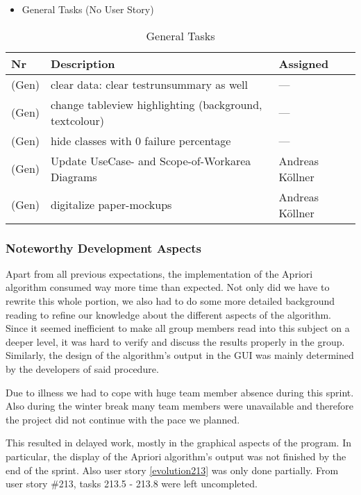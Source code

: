 \begin{itemize}
	\item General Tasks (No User Story)
	\end{itemize}

\begin{table}[h]
  \caption{General Tasks}
  \label{General Tasks}
  \centering
  \begin{tabular}{p{1cm}|p{5cm}|p{3cm}|}
  	Nr & Description & Assigned \\ 
  	\hline
  	(Gen) & clear data: clear testrunsummary as well & --- \\ 
  	\hline
  	(Gen) & change tableview highlighting (background, textcolour) & --- \\ 
  	\hline
  	(Gen) & hide classes with 0 failure percentage & --- \\ 
  	\hline
  	(Gen) & Update UseCase- and Scope-of-Workarea Diagrams & Andreas Köllner \\ 
  	\hline
  	(Gen) & digitalize paper-mockups & Andreas Köllner \\ 
  	\hline
  \end{tabular}
\end{table}


\subsubsection*{Noteworthy Development Aspects}

Apart from all previous expectations, the implementation of the Apriori algorithm consumed way more time than expected. Not only did we have to rewrite this whole portion, we also had to do some more detailed background reading to refine our knowledge about the different aspects of the algorithm. Since it seemed inefficient to make all group members read into this subject on a deeper level, it was hard to verify and discuss the results properly in the group. Similarly, the design of the algorithm's output in the GUI was mainly determined by the developers of said procedure.

Due to illness we had to cope with huge team member absence during this sprint. Also during the winter break many team members were unavailable and therefore the project did not continue with the pace we planned.

This resulted in delayed work, mostly in the graphical aspects of the program. In particular, the display of the Apriori algorithm's output was not finished by the end of the sprint. Also user story \ref{evolution213} was only done partially. From user story \#213, tasks 213.5 - 213.8 were left uncompleted. 


